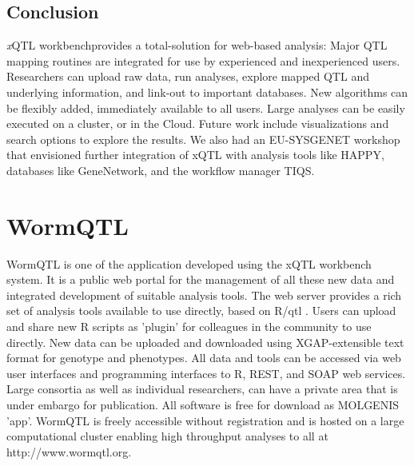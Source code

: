 \documentclass[8pt, twoside, a5paper]{report}
\newcommand{\xqtlwb}{{\it x}QTL workbench}
\begin{document}
\subsection{Conclusion}

\xqtlwb provides a total-solution for web-based analysis: Major QTL mapping routines are integrated for use by experienced 
and inexperienced users. Researchers can upload raw data, run analyses, explore mapped QTL and underlying information, and 
link-out to important databases. New algorithms can be flexibly added, immediately available to all users. Large analyses 
can be easily executed on a cluster, or in the Cloud. Future work include visualizations and search options to explore the 
results. We also had an EU-SYSGENET workshop that envisioned further integration of xQTL with analysis tools like HAPPY, 
databases like GeneNetwork, and the workflow manager TIQS\cite{Durrant:2012}.

\section{WormQTL}
WormQTL is one of the application developed using the xQTL workbench system. It is a public web portal for the management 
of all these new data and integrated development of suitable analysis tools. The web server provides a rich set of analysis 
tools available to use directly, based on R/qtl \cite{Broman:2003, Arends:2010}. Users can upload and share new R scripts 
as 'plugin' for colleagues in the community to use directly. New data can be uploaded and downloaded using XGAP-extensible 
text format for genotype and phenotypes\cite{Swertz:2010a}. All data and tools can be accessed via web user interfaces and 
programming interfaces to R, REST, and SOAP web services. Large consortia as well as individual researchers, can have a 
private area that is under embargo for publication. All software is free for download as MOLGENIS 'app'\cite{Swertz:2010b}. 
WormQTL is freely accessible without registration and is hosted on a large computational cluster enabling high throughput 
analyses to all at http://www.wormqtl.org.
\end{document}

